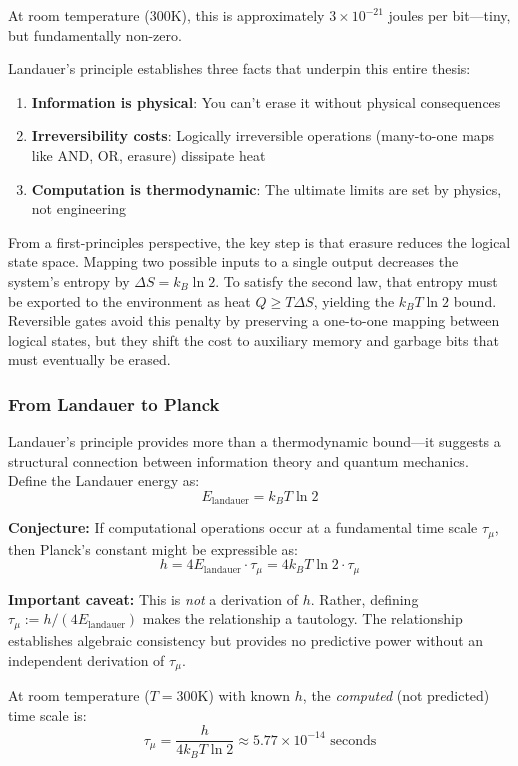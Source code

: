 At room temperature (300K), this is approximately $3 \times 10^{-21}$ joules per bit---tiny, but fundamentally non-zero.

Landauer's principle establishes three facts that underpin this entire thesis:
\begin{enumerate}
    \item \textbf{Information is physical}: You can't erase it without physical consequences
    \item \textbf{Irreversibility costs}: Logically irreversible operations (many-to-one maps like AND, OR, erasure) dissipate heat
    \item \textbf{Computation is thermodynamic}: The ultimate limits are set by physics, not engineering
\end{enumerate}

From a first-principles perspective, the key step is that erasure reduces the logical state space. Mapping two possible inputs to a single output decreases the system's entropy by $\Delta S = k_B \ln 2$. To satisfy the second law, that entropy must be exported to the environment as heat $Q \ge T \Delta S$, yielding the $k_B T \ln 2$ bound. Reversible gates avoid this penalty by preserving a one-to-one mapping between logical states, but they shift the cost to auxiliary memory and garbage bits that must eventually be erased.

\subsubsection{From Landauer to Planck}

Landauer's principle provides more than a thermodynamic bound---it suggests a structural connection between information theory and quantum mechanics. Define the Landauer energy as:
\[
E_{\text{landauer}} = k_B T \ln 2
\]

\textbf{Conjecture:} If computational operations occur at a fundamental time scale $\tau_\mu$, then Planck's constant might be expressible as:
\[
h = 4 E_{\text{landauer}} \cdot \tau_\mu = 4 k_B T \ln 2 \cdot \tau_\mu
\]

\textbf{Important caveat:} This is \textit{not} a derivation of $h$. Rather, defining $\tau_\mu := h / (4 E_{\text{landauer}})$ makes the relationship a tautology. The relationship establishes algebraic consistency but provides no predictive power without an independent derivation of $\tau_\mu$.

At room temperature ($T = 300$K) with known $h$, the \textit{computed} (not predicted) time scale is:
\[
\tau_\mu = \frac{h}{4 k_B T \ln 2} \approx 5.77 \times 10^{-14} \text{ seconds}
\]

